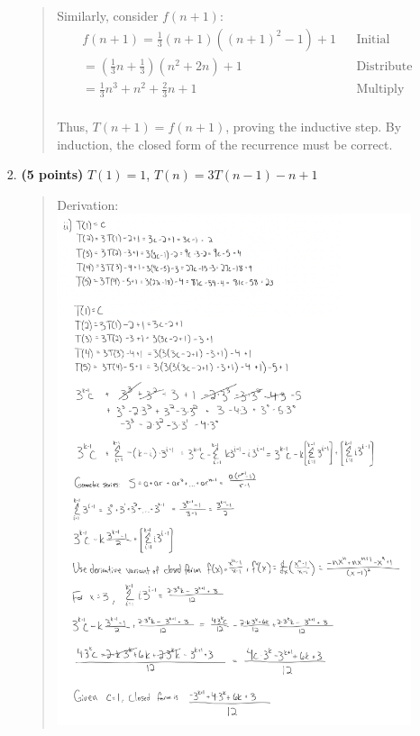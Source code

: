 \documentclass[11pt]{article}
\begin{document}
\begin{enumerate}[leftmargin=*]
\begin{enumerate}
\begin{enumerate}
\begin{quote}
          \medskip
          Similarly, consider $f(n + 1)$:
          \begin{align*}
              && f(n + 1) = \frac{1}{3}(n + 1)((n + 1)^2 - 1) + 1 && \text{Initial} && \\
              && = (\frac{1}{3}n + \frac{1}{3})(n^2 + 2n) + 1 && \text{Distribute and FOIL} && \\
              && = \frac{1}{3}n^3 + n^2 + \frac{2}{3}n + 1 && \text{Multiply and combine} && \\
          \end{align*} 

          \medskip
          Thus, $T(n + 1) = f(n + 1)$, proving the inductive step. By induction, the closed form of the recurrence must be correct. 
        \end{quote}
        \item
        {\bf (5 points)}
        $T(1) = 1$, $T(n) = 3T(n-1) - n + 1$
        \begin{quote}
          \color{purple}
          Derivation: \\ 
          \includegraphics[width=0.8\linewidth]{"./pics/4aii.png"}


\end{quote}
\end{enumerate}
\end{enumerate}
\end{enumerate}
\end{document}

